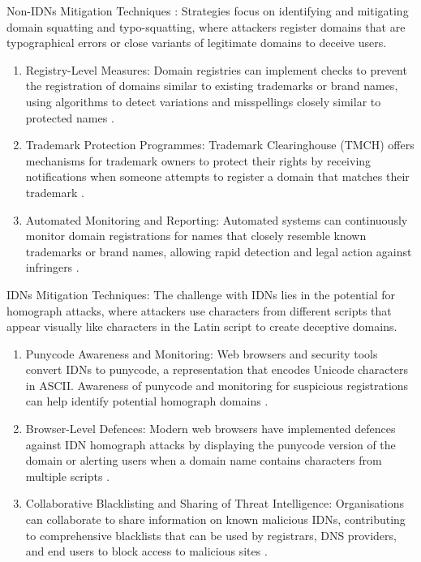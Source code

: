 Non-IDNs Mitigation Techniques : Strategies focus on identifying and mitigating domain squatting and typo-squatting, where attackers register domains that are typographical errors or close variants of legitimate domains to deceive users.

\begin{enumerate}
  \item Registry-Level Measures: Domain registries can implement checks to prevent the registration of domains similar to existing trademarks or brand names, using algorithms to detect variations and misspellings closely similar to protected names \cite{WTR2020}.
  \item Trademark Protection Programmes: Trademark Clearinghouse (TMCH) offers mechanisms for trademark owners to protect their rights by receiving notifications when someone attempts to register a domain that matches their trademark \cite{ICANNTMCH}.
  \item Automated Monitoring and Reporting: Automated systems can continuously monitor domain registrations for names that closely resemble known trademarks or brand names, allowing rapid detection and legal action against infringers \cite{TMCH2023}.
\end{enumerate}

IDNs Mitigation Techniques: The challenge with IDNs lies in the potential for homograph attacks, where attackers use characters from different scripts that appear visually like characters in the Latin script to create deceptive domains.

\begin{enumerate}
  \item Punycode Awareness and Monitoring: Web browsers and security tools convert IDNs to punycode, a representation that encodes Unicode characters in ASCII. Awareness of punycode and monitoring for suspicious registrations can help identify potential homograph domains \cite{SOCRadar2023}.
  \item Browser-Level Defences: Modern web browsers have implemented defences against IDN homograph attacks by displaying the punycode version of the domain or alerting users when a domain name contains characters from multiple scripts \cite{Malwarebytes2017}.
  \item Collaborative Blacklisting and Sharing of Threat Intelligence: Organisations can collaborate to share information on known malicious IDNs, contributing to comprehensive blacklists that can be used by registrars, DNS providers, and end users to block access to malicious sites \cite{CyberThreatAlliance2023}.
  
\end{enumerate}


